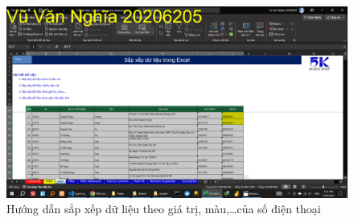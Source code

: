 \documentclass{article}
\begin{document}
\begin{figure}[h]
    \centering
    \includegraphics[scale = 0.15]{Video1/HuongDan/3.png}
    \caption{Hướng dẫn sắp xếp dữ liệu theo  giá trị, màu,\dots của số điện thoại}
\end{figure}
\end{document}
